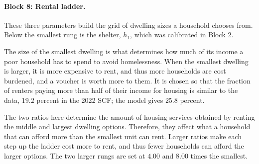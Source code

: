 \documentclass[10pt]{article}
\begin{document}
\paragraph{Block 8: Rental ladder.} These three parameters build the grid of dwelling
sizes a household chooses from. Below the smallest rung is the shelter, $h_1$, which was calibrated in Block 2.
\begin{description}\setlength{\itemsep}{0.25em}\setlength{\parskip}{0em}
\item[$h_2$, the smallest rental size.]   The size of the smallest dwelling is what determines how much of its income a poor household has to spend to avoid homelessness. When the smallest dwelling is larger, it is more expensive to rent, and thus more households are cost burdened, and a voucher is worth more to them. It is chosen so that
the fraction of renters paying more than half of their income for housing is similar to
the data, $19.2$ percent in the 2022 SCF; the model gives $25.8$
percent.
\item[$h_3/h_2$ and $h_4/h_2$, the spacing of the ladder.]   The two ratios here determine the amount of housing services obtained by renting the middle and largest dwelling options. Therefore, they affect what a household that can afford more than the smallest unit can rent. Larger ratios make each step up the ladder cost more to rent, and thus fewer households can afford the larger options. The two larger
rungs are set at $4.00$ and $8.00$ times the smallest.
\end{description}
\end{document}

